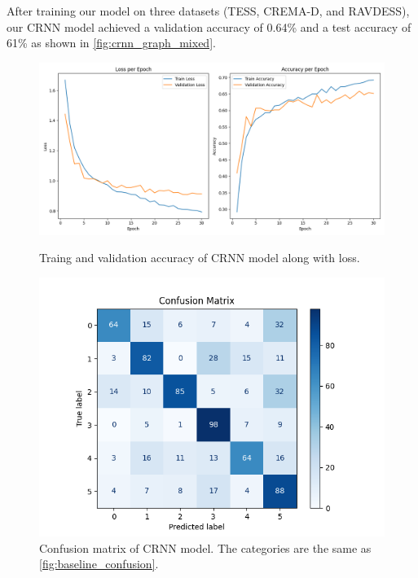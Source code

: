 \documentclass[../main.tex]{subfiles}
\begin{document}
After training our model on three datasets (TESS, CREMA-D, and RAVDESS), our 
CRNN model achieved a validation accuracy of 0.64\% and a test accuracy of 61\%
as shown in \autoref{fig:crnn_graph_mixed}.

\begin{figure}[ht]
    \centering
    \begin{minipage}{.5\textwidth}
      \centering
      \includegraphics[width=1.0\linewidth]{../resources/crnn_graph_mixed.png}
      \caption{Traing and validation accuracy of CRNN model along with loss.}
      \label{fig:crnn_graph_mixed}
    \end{minipage}%
    \hfill
    \begin{minipage}{.4\textwidth}
      \centering
      \includegraphics[width=1.0\linewidth]{../resources/crnn_confusion.png}
      \caption{Confusion matrix of CRNN model. The categories are the same 
      as \autoref{fig:baseline_confusion}.} 
      \label{fig:crnn_confusion}
    \end{minipage}
\end{figure}
\end{document}

